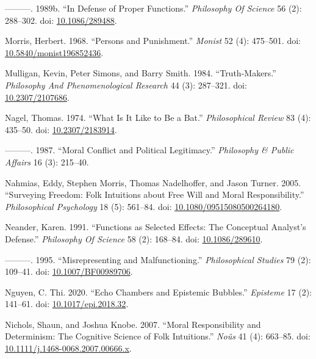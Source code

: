 \documentclass[
  10pt,
  letterpaper,
  DIV=11,
  numbers=noendperiod,
  twoside]{scrartcl}
\newlength{\cslhangindent}
\newenvironment{CSLReferences}[2] %
 {\begin{list}{}{%
  \setlength{\itemindent}{0pt}
  \setlength{\leftmargin}{0pt}
  \setlength{\parsep}{0pt}
  \ifodd #1
   \setlength{\leftmargin}{\cslhangindent}
   \setlength{\itemindent}{-1\cslhangindent}
  \fi
  \setlength{\itemsep}{#2\baselineskip}}}
 {\end{list}}
\begin{document}
\begin{CSLReferences}{1}{0}
---------. 1989b. {``In Defense of Proper Functions.''} \emph{Philosophy
Of Science} 56 (2): 288--302. doi:
\href{https://doi.org/10.1086/289488}{10.1086/289488}.

Morris, Herbert. 1968. {``Persons and Punishment.''} \emph{Monist} 52
(4): 475--501. doi:
\href{https://doi.org/10.5840/monist196852436}{10.5840/monist196852436}.

Mulligan, Kevin, Peter Simons, and Barry Smith. 1984.
{``Truth-Makers.''} \emph{Philosophy And Phenomenological Research} 44
(3): 287--321. doi:
\href{https://doi.org/10.2307/2107686}{10.2307/2107686}.

Nagel, Thomas. 1974. {``What Is It Like to Be a Bat.''}
\emph{Philosophical Review} 83 (4): 435--50. doi:
\href{https://doi.org/10.2307/2183914}{10.2307/2183914}.

---------. 1987. {``Moral Conflict and Political Legitimacy.''}
\emph{Philosophy \& Public Affairs} 16 (3): 215--40.

Nahmias, Eddy, Stephen Morris, Thomas Nadelhoffer, and Jason Turner.
2005. {``Surveying Freedom: Folk Intuitions about Free Will and Moral
Responsibility.''} \emph{Philosophical Psychology} 18 (5): 561--84. doi:
\href{https://doi.org/10.1080/09515080500264180}{10.1080/09515080500264180}.

Neander, Karen. 1991. {``Functions as Selected Effects: The Conceptual
Analyst's Defense.''} \emph{Philosophy Of Science} 58 (2): 168--84. doi:
\href{https://doi.org/10.1086/289610}{10.1086/289610}.

---------. 1995. {``Misrepresenting and Malfunctioning.''}
\emph{Philosophical Studies} 79 (2): 109--41. doi:
\href{https://doi.org/10.1007/BF00989706}{10.1007/BF00989706}.

Nguyen, C. Thi. 2020. {``Echo Chambers and Epistemic Bubbles.''}
\emph{Episteme} 17 (2): 141--61. doi:
\href{https://doi.org/10.1017/epi.2018.32}{10.1017/epi.2018.32}.

Nichols, Shaun, and Joshua Knobe. 2007. {``Moral Responsibility and
Determinism: The Cognitive Science of Folk Intuitions.''} \emph{Noûs} 41
(4): 663--85. doi:
\href{https://doi.org/10.1111/j.1468-0068.2007.00666.x}{10.1111/j.1468-0068.2007.00666.x}.


\end{CSLReferences}
\end{document}
